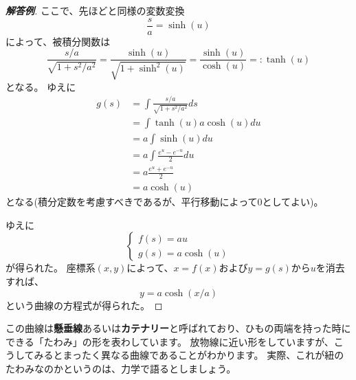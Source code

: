 \begin{proof}[\textbf{解答例}]
  ここで、先ほどと同様の変数変換
  \[
    \frac{s}{a}=\sinh(u)
  \]
  によって、被積分関数は
  \[
    \frac{s/a}{\sqrt{1+s^2/a^2}}=\frac{\sinh(u)}{\sqrt{1+\sinh^2(u)}}=\frac{\sinh(u)}{\cosh(u)}=:\tanh(u)
  \]
  となる。
  ゆえに
  \begin{align*}
    g(s)&=\int\frac{s/a}{\sqrt{1+s^2/a^2}}ds\\
    &=\int \tanh(u)a\cosh(u)du\\
    &=a\int\sinh(u)du\\
    &=a\int\frac{e^u-e^{-u}}{2}du\\
    &=a\frac{e^u+e^{-u}}{2}\\
    &=a\cosh(u)
  \end{align*}
  となる(積分定数を考慮すべきであるが、平行移動によって0としてよい)。

  ゆえに
  \[
    \begin{cases}
      f(s)=au\\
      g(s)=a\cosh(u)
    \end{cases}
  \]
  が得られた。
  座標系$(x,y)$によって、$x=f(x)$および$y=g(s)$から$u$を消去すれば、
  \[
    y=a\cosh(x/a)
  \]
  という曲線の方程式が得られた。
\end{proof}
この曲線は\textbf{懸垂線}あるいは\textbf{カテナリー}と呼ばれており、ひもの両端を持った時にできる「たわみ」の形を表わしています。
放物線に近い形をしていますが、こうしてみるとまったく異なる曲線であることがわかります。
実際、これが紐のたわみなのかというのは、力学で語るとしましょう。
